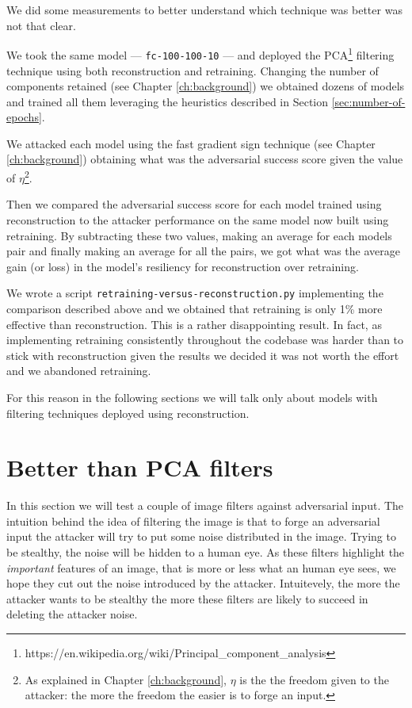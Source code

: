 We did some measurements to better understand which technique was
better was not that clear.

We took the same model --- \texttt{fc-100-100-10} --- and deployed the
PCA\footnote{https://en.wikipedia.org/wiki/Principal\_component\_analysis}
filtering technique using both reconstruction and retraining. Changing
the number of components retained (see Chapter \ref{ch:background}) we
obtained dozens of models and trained all them leveraging the
heuristics described in Section
\ref{sec:number-of-epochs}.

We attacked each model using the fast gradient sign technique (see
Chapter \ref{ch:background}) obtaining what was the adversarial success
score given the value of $\eta$\footnote{As explained in Chapter
  \ref{ch:background}, $\eta$ is the the freedom given to the attacker:
  the more the freedom the easier is to forge an input.}.

Then we compared the adversarial success score for each model trained
using reconstruction to the attacker performance on the same model now
built using retraining. By subtracting these two values, making an
average for each models pair and finally making an average for all the
pairs, we got what was the average gain (or loss) in the model's
resiliency for reconstruction over retraining.

We wrote a script \texttt{retraining-versus-reconstruction.py}
implementing the comparison described above and we obtained that
retraining is only 1\% more effective than reconstruction. This is a
rather disappointing result. In fact, as implementing retraining
consistently throughout the codebase was harder than to stick with
reconstruction given the results we decided it was not worth the effort
and we abandoned retraining.

For this reason in the following sections we will talk only about models
with filtering techniques deployed using reconstruction.

\section{Better than PCA filters}

In this section we will test a couple of image filters against
adversarial input. The intuition behind the idea of filtering the image
is that to forge an adversarial input the attacker will try to put some
noise distributed in the image. Trying to be stealthy, the noise will be
hidden to a human eye. As these filters highlight the \emph{important}
features of an image, that is more or less what an human eye sees, we
hope they cut out the noise introduced by the attacker. Intuitevely,
the more the attacker wants to be stealthy the more these filters are
likely to succeed in deleting the attacker noise.

